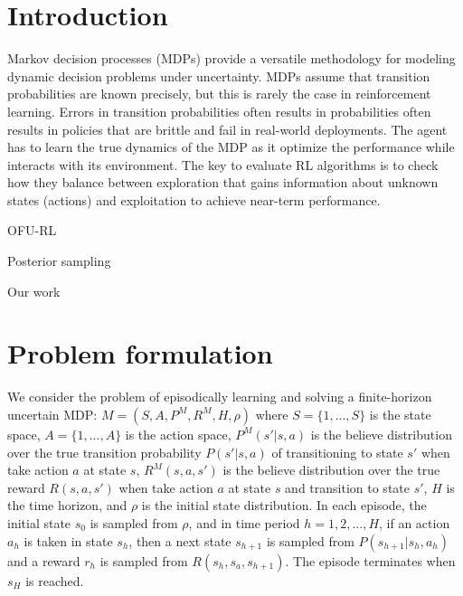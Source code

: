 \documentclass{article}
\begin{document}
\section{Introduction}






Markov decision processes (MDPs) provide a versatile methodology for
modeling dynamic decision problems under uncertainty. MDPs assume that
transition probabilities are known precisely, but this is rarely the
case in reinforcement learning. Errors in transition probabilities
often results in probabilities often results in policies that are
brittle and fail in real-world deployments. The agent has to learn the
true dynamics of the MDP as it optimize the performance while
interacts with its environment. The key to evaluate RL algorithms is
to check how they balance between exploration that gains information
about unknown states (actions) and exploitation to  achieve near-term
performance. 


OFU-RL

Posterior sampling

Our work

\section{Problem formulation}

We consider the problem of episodically learning and solving a 
finite-horizon uncertain MDP: $M = (S, A, P^M, R^M, H, \rho)$ where $S =
\{1,...,S\}$ is the state space, $A = \{1,...,A\}$ is the action
space,  $P^M(s'|s,a)$ is the believe distribution over the true
transition probability $P(s'|s,a)$ of transitioning to state $s'$ when
take action $a$ at state $s$, $R^M(s,a,s')$ is the believe
distribution over the true reward $R(s,a,s')$ when take action $a$ at
state $s$ and transition to state $s'$, $H$ is the time horizon, and
$\rho$ is the initial state distribution. In each episode, the initial
state $s_0$ is sampled from $\rho$, and in time period
$h=1,2,...,H$, if an action $a_h$ is taken in state $s_h$, then a
next state $s_{h+1}$ is sampled from $P(s_{h+1}|s_h,a_h)$ and a reward
$r_h$ is sampled from $R(s_h,s_a,s_{h+1})$. The episode terminates
when $s_H$ is reached. 
\end{document}
